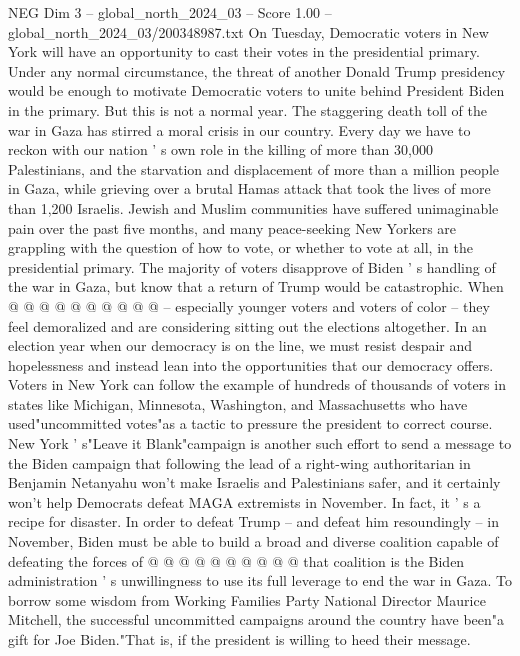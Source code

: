 \begin{textsample}{NEG Dim 3 – global\_north\_2024\_03 – Score 1.00 – global\_north\_2024\_03/200348987.txt}  \label{ex:f3_neg_167}
On Tuesday, Democratic voters in New York will have an opportunity to cast their votes in the presidential primary.
Under any normal circumstance, the threat of another Donald Trump presidency would be enough to motivate Democratic voters to unite behind President Biden in the primary.
But this is not a normal year.
The staggering death toll of the war in Gaza has stirred a moral crisis in our country.
Every day we have to reckon with our nation ' s own role in the killing of more than 30,000 Palestinians, and the starvation and displacement of more than a million people in Gaza, while grieving over a brutal Hamas attack that took the lives of more than 1,200 Israelis.
Jewish and Muslim communities have suffered unimaginable pain over the past five months, and many peace-seeking New Yorkers are grappling with the question of how to vote, or whether to vote at all, in the presidential primary.
The majority of voters disapprove of Biden ' s handling of the war in Gaza, but know that a return of Trump would be catastrophic.
When @ @ @ @ @ @ @ @ @ @ -- especially younger voters and voters of color -- they feel demoralized and are considering sitting out the elections altogether.
In an election year when our democracy is on the line, we must resist despair and hopelessness and instead lean into the opportunities that our democracy offers.
Voters in New York can follow the example of hundreds of thousands of voters in states like Michigan, Minnesota, Washington, and Massachusetts who have used"uncommitted votes"as a tactic to pressure the president to correct course.
New York ' s"Leave it Blank"campaign is another such effort to send a message to the Biden campaign that following the lead of a right-wing authoritarian in Benjamin Netanyahu won't make Israelis and Palestinians safer, and it certainly won't help Democrats defeat MAGA extremists in November.
In fact, it ' s a recipe for disaster.
In order to defeat Trump -- and defeat him resoundingly -- in November, Biden must be able to build a broad and diverse coalition capable of defeating the forces of @ @ @ @ @ @ @ @ @ @ that coalition is the Biden administration ' s unwillingness to use its full leverage to end the war in Gaza.
To borrow some wisdom from Working Families Party National Director Maurice Mitchell, the successful uncommitted campaigns around the country have been"a gift for Joe Biden."That is, if the president is willing to heed their message.

\end{textsample}
